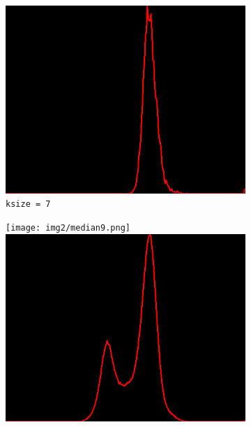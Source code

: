 \begin{figure}[H]
\begin{subfigure}[b]{0.24\textwidth}
        \includegraphics[width=\textwidth]{img2/hist_rect_7_median_7_final_img2.png}
        \caption{\lstinline|ksize = 7|}
        \label{fig:img2_kernel7}
    \end{subfigure}
    \begin{subfigure}[b]{0.24\textwidth}
        \texttt{[image: img2/median9.png]}\\[0.1cm]
        \includegraphics[width=\textwidth]{img2/hist_9_median_9_final_img2.png}
        \begin{center}
        	\text{ }
        \end{center}

\end{subfigure}
\end{figure}
